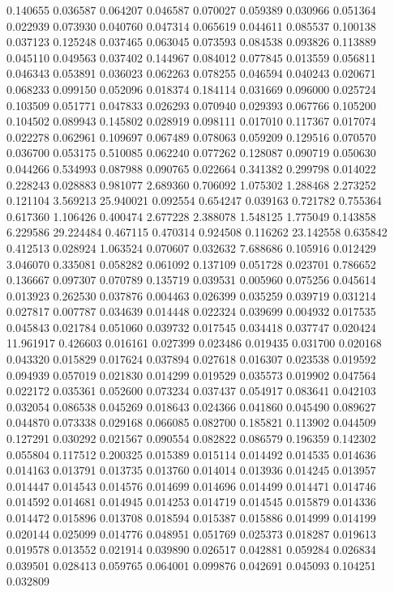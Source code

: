 0.140655
0.036587
0.064207
0.046587
0.070027
0.059389
0.030966
0.051364
0.022939
0.073930
0.040760
0.047314
0.065619
0.044611
0.085537
0.100138
0.037123
0.125248
0.037465
0.063045
0.073593
0.084538
0.093826
0.113889
0.045110
0.049563
0.037402
0.144967
0.084012
0.077845
0.013559
0.056811
0.046343
0.053891
0.036023
0.062263
0.078255
0.046594
0.040243
0.020671
0.068233
0.099150
0.052096
0.018374
0.184114
0.031669
0.096000
0.025724
0.103509
0.051771
0.047833
0.026293
0.070940
0.029393
0.067766
0.105200
0.104502
0.089943
0.145802
0.028919
0.098111
0.017010
0.117367
0.017074
0.022278
0.062961
0.109697
0.067489
0.078063
0.059209
0.129516
0.070570
0.036700
0.053175
0.510085
0.062240
0.077262
0.128087
0.090719
0.050630
0.044266
0.534993
0.087988
0.090765
0.022664
0.341382
0.299798
0.014022
0.228243
0.028883
0.981077
2.689360
0.706092
1.075302
1.288468
2.273252
0.121104
3.569213
25.940021
0.092554
0.654247
0.039163
0.721782
0.755364
0.617360
1.106426
0.400474
2.677228
2.388078
1.548125
1.775049
0.143858
6.229586
29.224484
0.467115
0.470314
0.924508
0.116262
23.142558
0.635842
0.412513
0.028924
1.063524
0.070607
0.032632
7.688686
0.105916
0.012429
3.046070
0.335081
0.058282
0.061092
0.137109
0.051728
0.023701
0.786652
0.136667
0.097307
0.070789
0.135719
0.039531
0.005960
0.075256
0.045614
0.013923
0.262530
0.037876
0.004463
0.026399
0.035259
0.039719
0.031214
0.027817
0.007787
0.034639
0.014448
0.022324
0.039699
0.004932
0.017535
0.045843
0.021784
0.051060
0.039732
0.017545
0.034418
0.037747
0.020424
11.961917
0.426603
0.016161
0.027399
0.023486
0.019435
0.031700
0.020168
0.043320
0.015829
0.017624
0.037894
0.027618
0.016307
0.023538
0.019592
0.094939
0.057019
0.021830
0.014299
0.019529
0.035573
0.019902
0.047564
0.022172
0.035361
0.052600
0.073234
0.037437
0.054917
0.083641
0.042103
0.032054
0.086538
0.045269
0.018643
0.024366
0.041860
0.045490
0.089627
0.044870
0.073338
0.029168
0.066085
0.082700
0.185821
0.113902
0.044509
0.127291
0.030292
0.021567
0.090554
0.082822
0.086579
0.196359
0.142302
0.055804
0.117512
0.200325
0.015389
0.015114
0.014492
0.014535
0.014636
0.014163
0.013791
0.013735
0.013760
0.014014
0.013936
0.014245
0.013957
0.014447
0.014543
0.014576
0.014699
0.014696
0.014499
0.014471
0.014746
0.014592
0.014681
0.014945
0.014253
0.014719
0.014545
0.015879
0.014336
0.014472
0.015896
0.013708
0.018594
0.015387
0.015886
0.014999
0.014199
0.020144
0.025099
0.014776
0.048951
0.051769
0.025373
0.018287
0.019613
0.019578
0.013552
0.021914
0.039890
0.026517
0.042881
0.059284
0.026834
0.039501
0.028413
0.059765
0.064001
0.099876
0.042691
0.045093
0.104251
0.032809
